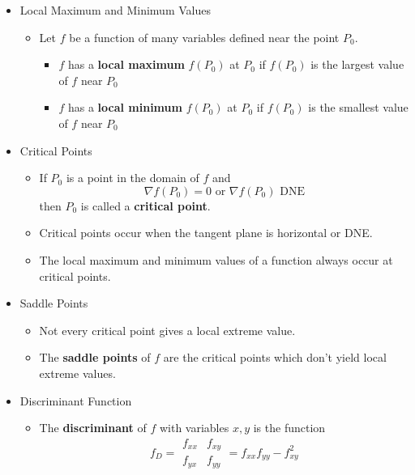 \documentclass[12pt]{article}
\newcommand{\<}{\left<}
\renewcommand{\>}{\right>}
\begin{document}
\begin{itemize}

  \item Local Maximum and Minimum Values
  
    \begin{itemize}
    \item Let $f$ be a function of many variables defined near the point $P_0$.
      \begin{itemize}
      \item $f$ has a \textbf{local maximum} $f(P_0)$ at $P_0$ if $f(P_0)$ is the largest value of $f$ near $P_0$
      \item $f$ has a \textbf{local minimum} $f(P_0)$ at $P_0$ if $f(P_0)$ is the smallest value of $f$ near $P_0$
      \end{itemize}
    \end{itemize}

  \item Critical Points
    \begin{itemize}
      \item
        If $P_0$ is a point in the domain of $f$ and
          \[
            \nabla f(P_0) = 0 \text{ or } \nabla f(P_0) \text{ DNE}
          \]
        then $P_0$ is called a \textbf{critical point}.
      \item
        Critical points occur when the tangent plane is horizontal or DNE.
      \item
        The local maximum and minimum values of a function always occur at critical points.
    \end{itemize}
    
  \item Saddle Points
  
    \begin{itemize}
      \item 
        Not every critical point gives a local extreme value.
      \item 
        The \textbf{saddle points} of $f$ are the critical points which don't yield local extreme values.
    \end{itemize}
    
  \item Discriminant Function
    \begin{itemize}
      \item The \textbf{discriminant} of $f$ with variables $x,y$ is the function
        \[
          f_D = \begin{array}{|cc|}f_{xx}&f_{xy}\\f_{yx}&f_{yy}\end{array} = f_{xx}f_{yy} - f_{xy}^2
        \]
    \end{itemize}


\end{itemize}
\end{document}
